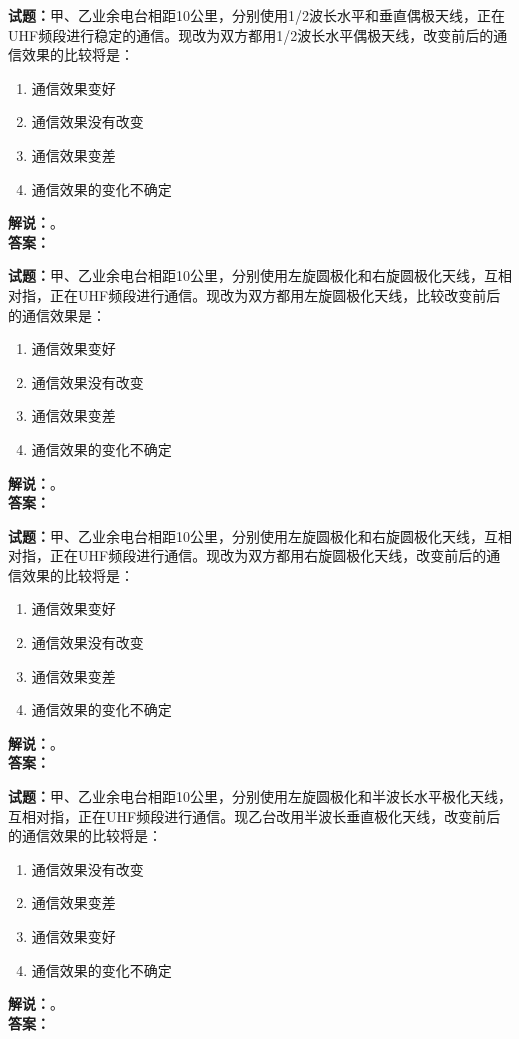 \documentclass{ctexbook}
\begin{document}
\bigskip

\noindent\textbf{试题：}甲、乙业余电台相距10公里，分别使用1/2波长水平和垂直偶极天线，正在UHF频段进行稳定的通信。现改为双方都用1/2波长水平偶极天线，改变前后的通信效果的比较将是：
\begin{enumerate}[leftmargin=3em]
  \item 通信效果变好
  \item 通信效果没有改变
  \item 通信效果变差
  \item 通信效果的变化不确定
\end{enumerate}
\noindent\textbf{解说：}\textbf{}。\\\noindent\textbf{答案：}

\bigskip

\noindent\textbf{试题：}甲、乙业余电台相距10公里，分别使用左旋圆极化和右旋圆极化天线，互相对指，正在UHF频段进行通信。现改为双方都用左旋圆极化天线，比较改变前后的通信效果是：
\begin{enumerate}[leftmargin=3em]
  \item 通信效果变好
  \item 通信效果没有改变
  \item 通信效果变差
  \item 通信效果的变化不确定
\end{enumerate}
\noindent\textbf{解说：}\textbf{}。\\\noindent\textbf{答案：}

\bigskip

\noindent\textbf{试题：}甲、乙业余电台相距10公里，分别使用左旋圆极化和右旋圆极化天线，互相对指，正在UHF频段进行通信。现改为双方都用右旋圆极化天线，改变前后的通信效果的比较将是：
\begin{enumerate}[leftmargin=3em]
  \item 通信效果变好
  \item 通信效果没有改变
  \item 通信效果变差
  \item 通信效果的变化不确定
\end{enumerate}
\noindent\textbf{解说：}\textbf{}。\\\noindent\textbf{答案：}

\bigskip

\noindent\textbf{试题：}甲、乙业余电台相距10公里，分别使用左旋圆极化和半波长水平极化天线，互相对指，正在UHF频段进行通信。现乙台改用半波长垂直极化天线，改变前后的通信效果的比较将是：
\begin{enumerate}[leftmargin=3em]
  \item 通信效果没有改变
  \item 通信效果变差
  \item 通信效果变好
  \item 通信效果的变化不确定
\end{enumerate}
\noindent\textbf{解说：}\textbf{}。\\\noindent\textbf{答案：}
\end{document}
